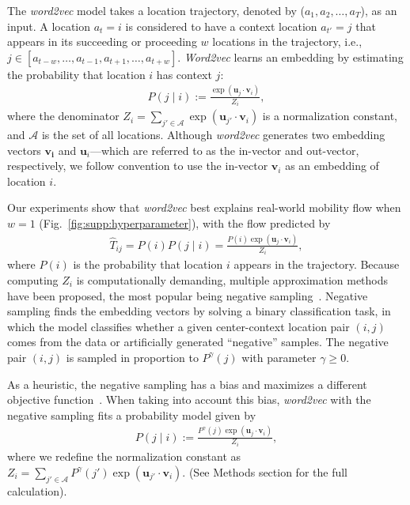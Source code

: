 \documentclass[12pt]{article} %
\def\given{\mid}
\def\ie{i.e.,~}
\begin{document}
The {\it word2vec} model takes a location trajectory, denoted by ($a_{1}, a_{2}, \ldots, a_{T}$), as an input.
A location $a_t=i$ is considered to have a context location $a_{t'}=j$ that appears in its succeeding or proceeding $w$ locations in the trajectory, \ie  $j \in [a_{t-w}, \ldots, a_{t-1}, a_{t+1},\ldots, a_{t+w}]$.
	{\it Word2vec} learns an embedding by estimating the probability that location $i$ has context $j$:
\begin{align}
	P\left(j \given i \right):= \frac{\exp(\bm{u}_j \cdot \bm{v}_{i})}{Z_i}, \label{eq:prob_w2v_ng}
\end{align}
where the denominator $Z_i=\sum_{j' \in \mathcal{A}} \exp(\bm{u}_{j'} \cdot \bm{v}_{i})$ is a normalization constant, and $\mathcal{A}$ is the set of all locations.
Although {\it word2vec} generates two embedding vectors $\bm{v_i}$ and $\bm{u}_i$---which are referred to as the in-vector and out-vector, respectively, we follow convention to use the in-vector $\bm{v}_i$ as an embedding of location $i$.

Our experiments show that {\it word2vec} best explains real-world mobility flow when $w=1$ (Fig.~\ref{fig:supp:hyperparameter}), with the flow predicted by
\begin{align}
	\label{eq:flow_w2v}
	\hat{T}_{ij} = P(i) P(j\given i) = \frac{P(i)\exp(\bm{u}_j \cdot \bm{v}_{i})}{Z_i},
\end{align}
where $P(i)$ is the probability that location $i$ appears in the trajectory.
Because computing $Z_i$ is computationally demanding, multiple approximation methods have been proposed, the most popular being negative sampling~\autocite{mikolov2013word2vec}.
Negative sampling finds the embedding vectors by solving a binary classification task, in which the model classifies whether a given center-context location pair $(i, j)$ comes from the data or artificially generated ``negative'' samples.
The negative pair $(i,j)$ is sampled in proportion to $P^\gamma(j)$ with parameter $\gamma \geq 0$.

As a heuristic, the negative sampling has a bias and maximizes a different objective function~\autocite{Gutmann2010}.
When taking into account this bias, {\it word2vec} with the negative sampling fits a probability model given by
\begin{align}
	P\left(j \given i \right):= \frac{P^ \gamma(j) \exp(\bm{u}_j \cdot \bm{v}_{i})}{Z_i}, \label{eq:prob_w2v_ng0}
\end{align}
where we redefine the normalization constant as $Z_i=\sum_{j' \in \mathcal{A}} P^ \gamma (j') \exp(\bm{u}_{j'} \cdot \bm{v}_{i})$. (See Methods section for the full calculation).
\end{document}
